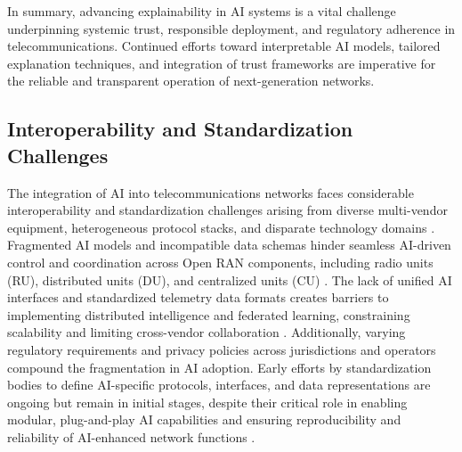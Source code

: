 \documentclass[sigconf]{acmart}
\begin{document}
In summary, advancing explainability in AI systems is a vital challenge underpinning systemic trust, responsible deployment, and regulatory adherence in telecommunications. Continued efforts toward interpretable AI models, tailored explanation techniques, and integration of trust frameworks are imperative for the reliable and transparent operation of next-generation networks.

\subsection{Interoperability and Standardization Challenges}

The integration of AI into telecommunications networks faces considerable interoperability and standardization challenges arising from diverse multi-vendor equipment, heterogeneous protocol stacks, and disparate technology domains \cite{ref48,ref52,ref54}. Fragmented AI models and incompatible data schemas hinder seamless AI-driven control and coordination across Open RAN components, including radio units (RU), distributed units (DU), and centralized units (CU) \cite{ref48}. The lack of unified AI interfaces and standardized telemetry data formats creates barriers to implementing distributed intelligence and federated learning, constraining scalability and limiting cross-vendor collaboration \cite{ref52}. Additionally, varying regulatory requirements and privacy policies across jurisdictions and operators compound the fragmentation in AI adoption. Early efforts by standardization bodies to define AI-specific protocols, interfaces, and data representations are ongoing but remain in initial stages, despite their critical role in enabling modular, plug-and-play AI capabilities and ensuring reproducibility and reliability of AI-enhanced network functions \cite{ref54}. 
\end{document}
